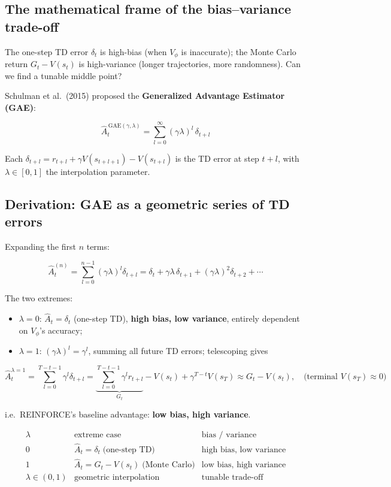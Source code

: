 \documentclass{article}
\begin{document}
\subsection*{The mathematical frame of the bias--variance trade-off}

The one-step TD error $\delta_t$ is high-bias (when $V_\phi$ is inaccurate); the Monte Carlo return $G_t - V(s_t)$ is high-variance (longer trajectories, more randomness). Can we find a tunable middle point?

Schulman et al.\ (2015) proposed the \textbf{Generalized Advantage Estimator (GAE)}:

\[
\boxed{\hat{A}_t^{\,\text{GAE}(\gamma,\lambda)} = \sum_{l=0}^{\infty} (\gamma\lambda)^l \,\delta_{t+l}}
\]

Each $\delta_{t+l} = r_{t+l} + \gamma V(s_{t+l+1}) - V(s_{t+l})$ is the TD error at step $t+l$, with $\lambda \in [0,1]$ the interpolation parameter.

\subsection*{Derivation: GAE as a geometric series of TD errors}

Expanding the first $n$ terms:

\[
\hat{A}_t^{(n)} = \sum_{l=0}^{n-1} (\gamma\lambda)^l \delta_{t+l}
= \delta_t + \gamma\lambda\,\delta_{t+1} + (\gamma\lambda)^2 \delta_{t+2} + \cdots
\]

The two extremes:

\begin{itemize}
  \item $\lambda = 0$: $\hat{A}_t = \delta_t$ (one-step TD), \textbf{high bias, low variance}, entirely dependent on $V_\phi$'s accuracy;
  \item $\lambda = 1$: $(\gamma\lambda)^l = \gamma^l$, summing all future TD errors; telescoping gives
\end{itemize}

\[
\hat{A}_t^{\lambda=1} = \sum_{l=0}^{T-t-1}\gamma^l \delta_{t+l}
= \underbrace{\sum_{l=0}^{T-t-1}\gamma^l r_{t+l}}_{G_t} - V(s_t) + \gamma^{T-t}V(s_T)
\approx G_t - V(s_t), \quad \text{(terminal }V(s_T)\approx 0\text{)}
\]

i.e.\ REINFORCE's baseline advantage: \textbf{low bias, high variance}.

\[
\begin{array}{c|c|c}
\lambda & \text{extreme case} & \text{bias / variance} \\
\hline
0 & \hat{A}_t = \delta_t \;\text{(one-step TD)} & \text{high bias, low variance} \\
1 & \hat{A}_t = G_t - V(s_t) \;\text{(Monte Carlo)} & \text{low bias, high variance} \\
\lambda \in (0,1) & \text{geometric interpolation} & \text{tunable trade-off} \\
\end{array}
\]
\end{document}
